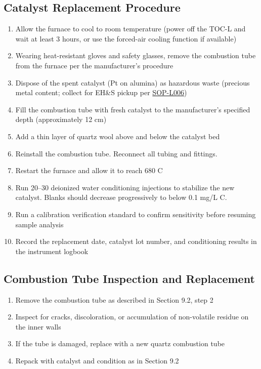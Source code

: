 \documentclass[
  11pt,
  letterpaper,
]{article}
\providecommand{\tightlist}{%
  \setlength{\itemsep}{0pt}\setlength{\parskip}{0pt}}
\begin{document}
\subsection{Catalyst Replacement
Procedure}\label{catalyst-replacement-procedure}

\begin{enumerate}
\def\labelenumi{\arabic{enumi}.}
\tightlist
\item
  Allow the furnace to cool to room temperature (power off the TOC-L and
  wait at least 3 hours, or use the forced-air cooling function if
  available)
\item
  Wearing heat-resistant gloves and safety glasses, remove the
  combustion tube from the furnace per the manufacturer's procedure
\item
  Dispose of the spent catalyst (Pt on alumina) as hazardous waste
  (precious metal content; collect for EH\&S pickup per
  \href{SOP-L006-waste-disposal.qmd}{SOP-L006})
\item
  Fill the combustion tube with fresh catalyst to the manufacturer's
  specified depth (approximately 12 cm)
\item
  Add a thin layer of quartz wool above and below the catalyst bed
\item
  Reinstall the combustion tube. Reconnect all tubing and fittings.
\item
  Restart the furnace and allow it to reach 680 C
\item
  Run 20--30 deionized water conditioning injections to stabilize the
  new catalyst. Blanks should decrease progressively to below 0.1 mg/L
  C.
\item
  Run a calibration verification standard to confirm sensitivity before
  resuming sample analysis
\item
  Record the replacement date, catalyst lot number, and conditioning
  results in the instrument logbook
\end{enumerate}

\subsection{Combustion Tube Inspection and
Replacement}\label{combustion-tube-inspection-and-replacement}

\begin{enumerate}
\def\labelenumi{\arabic{enumi}.}
\tightlist
\item
  Remove the combustion tube as described in Section 9.2, step 2
\item
  Inspect for cracks, discoloration, or accumulation of non-volatile
  residue on the inner walls
\item
  If the tube is damaged, replace with a new quartz combustion tube
\item
  Repack with catalyst and condition as in Section 9.2
\end{enumerate}
\end{document}
